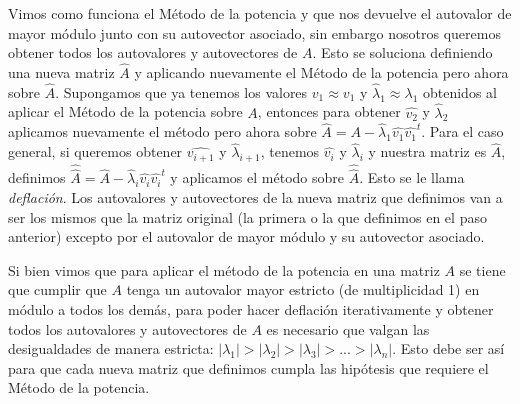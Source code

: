 \par Vimos como funciona el Método de la potencia y que nos devuelve el autovalor de mayor módulo junto con su autovector asociado, sin embargo nosotros queremos obtener todos los autovalores y autovectores de $A$. Esto se soluciona definiendo una nueva matriz $\widehat{A}$ y aplicando nuevamente el Método de la potencia pero ahora sobre $\widehat{A}$. Supongamos que ya tenemos los valores $\widehat{v_1} \approx v_1$ y $\widehat{\lambda}_1 \approx \lambda_1$ obtenidos al aplicar el Método de la potencia sobre $A$, entonces para obtener $\widehat{v_2}$ y $\widehat{\lambda}_2$ aplicamos nuevamente el método pero ahora sobre $\widehat{A} = A - \widehat{\lambda}_1\widehat{v_1}\widehat{v_1}^t$. Para el caso general, si queremos obtener $\widehat{v_{i + 1}}$ y $\widehat{\lambda}_{i + 1}$, tenemos $\widehat{v_i}$ y $\widehat{\lambda}_i$ y nuestra matriz es $\widehat{A}$, definimos $\widehat{\widehat{A}} = \widehat{A} - \widehat{\lambda}_i\widehat{v_i}\widehat{v_i}^t$ y aplicamos el método sobre $\widehat{\widehat{A}}$. Esto se le llama \textit{deflación}. Los autovalores y autovectores de la nueva matriz que definimos van a ser los mismos que la matriz original (la primera o la que definimos en el paso anterior) excepto por el autovalor de mayor módulo y su autovector asociado.
\par Si bien vimos que para aplicar el método de la potencia en una matriz $A$ se tiene que cumplir que $A$ tenga un autovalor mayor estricto (de multiplicidad 1) en módulo a todos los demás, para poder hacer deflación iterativamente y obtener todos los autovalores y autovectores de $A$ es necesario que valgan las desigualdades de manera estricta: $|\lambda_1| > |\lambda_2| > |\lambda_3| > ... > |\lambda_n|$. Esto debe ser así para que cada nueva matriz que definimos cumpla las hipótesis que requiere el Método de la potencia.
